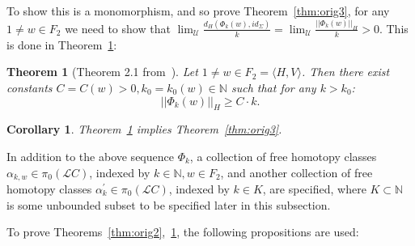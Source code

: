 \documentclass[11pt]{article}
\newtheorem{theorem}{Theorem}[section]
\newtheorem*{corollary}{Corollary}
\newcommand{\N}{\mathbb{N}}
\begin{document}
            To show this is a monomorphism, and so prove Theorem~\ref{thm:orig3}, for any $1 \neq w \in F_2$ we need to show that $\lim_\mathcal{U} \frac{d_H(\Phi_k(w), id_\Sigma)}{k} = \lim_\mathcal{U} \frac{|| \Phi_k(w) ||_H}{k} > 0$. This is done in Theorem~\ref{thm:4}:
            
            \begin{theorem}[Theorem 2.1 from~\cite{10}]
            \label{thm:4}
                Let $1 \neq w \in F_2 = \langle H,V \rangle$. Then there exist constants $C = C(w) > 0, k_0 = k_0(w) \in \N$ such that for any $k > k_0$:
                \[
                    || \Phi_k(w) ||_H \geq C \cdot k.
                \]
            \end{theorem}
            
            \begin{corollary}
                Theorem~\ref{thm:4} implies Theorem~\ref{thm:orig3}.
            \end{corollary}
            
            In addition to the above sequence $\Phi_k$, a collection of free homotopy classes $\alpha_{k,w} \in \pi_0(\mathscr{L}C)$, indexed by $k \in \N, w \in F_2$, and another collection of free homotopy classes $\alpha_k^\prime \in \pi_0(\mathscr{L}C)$, indexed by $k \in K$, are specified, where $K \subset \N$ is some unbounded subset to be specified later in this subsection.
            
            To prove Theorems~\ref{thm:orig2},~\ref{thm:4}, the following propositions are used:
            
\end{document}
